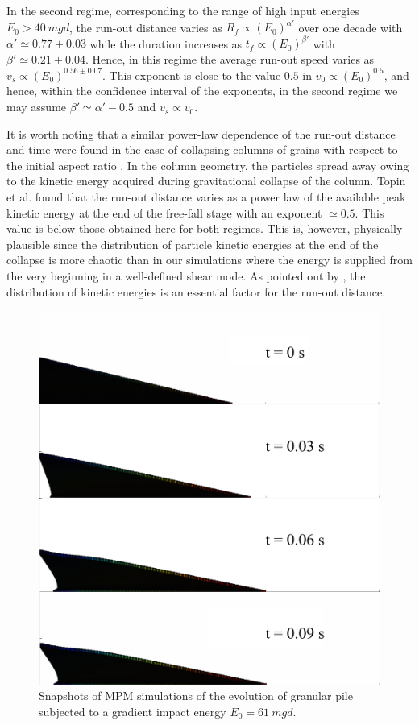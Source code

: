 In the second regime, corresponding to the range of high input energies  $E_0 > 
40 \ mgd$, the run-out distance varies as $R_f \propto (E_0)^{\alpha'}$ over one 
decade with $\alpha' \simeq 0.77\pm 0.03$ while the duration increases as $t_f 
\propto (E_0)^{\beta'}$ with $\beta' \simeq 0.21 \pm 0.04$. Hence, in this 
regime the average run-out speed varies as $v_s \propto (E_0)^{0.56 \pm 0.07}$. 
This exponent is close to the value $0.5$ in $v_0 \propto (E_0)^{0.5}$, and 
hence, within the confidence interval of the exponents, in the second regime we 
may assume $\beta' \simeq \alpha' - 0.5$ and $v_s \propto v_0$. 

It is worth noting that a similar power-law dependence of the 
run-out distance and time were found in the case of 
collapsing columns of grains with respect to the initial aspect ratio 
\cite{Topin2012}.  
In the column geometry, the particles spread away owing to the 
kinetic energy acquired during gravitational collapse of the column. 
Topin et al. found that the run-out distance varies as a power law 
of the available peak kinetic energy at the end of the free-fall stage with an 
exponent $\simeq 0.5$. This value is below those obtained here 
for both regimes. This is, however, physically plausible since the   
distribution of particle kinetic energies at the end of the collapse 
is more chaotic than in our simulations where the energy is supplied 
from the very beginning in a well-defined shear mode. As pointed out 
by \cite{Staron2005}, the distribution of kinetic energies is an essential 
factor for the run-out distance.

\begin{figure}[tbph]
\centering
\includegraphics[width=\textwidth]{Gradient_Slope_Profile_200J}
\caption{Snapshots of MPM simulations of the evolution of granular pile 
subjected to a gradient impact energy $E_0 = 61 \ mgd$.}
\label{fig:Gradient_Slope_Profile_200J}
\end{figure}

